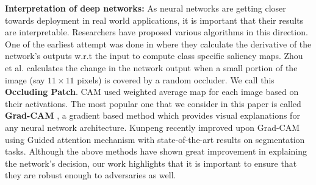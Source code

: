 \documentclass[10pt,twocolumn,letterpaper]{article}
\begin{document}
{\bf Interpretation of deep networks:}
As neural networks are getting closer towards deployment in real world applications, it is important that their results are interpretable.
Researchers have proposed various algorithms in this direction. One of the earliest attempt was done in \cite{simonyan2013deep} where they calculate the derivative of the network's outputs w.r.t the input to compute class specific saliency maps. Zhou et al. \cite{zhou2014object} calculates the change in the network output when a small portion of the image (say $11\times11$ pixels) is covered by a random occluder. We call this \textbf{Occluding Patch}. CAM \cite{zhou2016learning} used weighted average map for each image based on their activations. The most popular one that we consider in this paper is called \textbf{Grad-CAM} \cite{selvaraju2016grad}, a gradient based method which provides visual explanations for any neural network architecture. Kunpeng \etal \cite{kunpeng2018gain} recently improved upon Grad-CAM using Guided attention mechanism with state-of-the-art results on segmentation tasks. Although the above methods have shown great improvement in explaining the network's decision, our work highlights that it is important to ensure that they are robust enough to adversaries as well.

\end{document}
